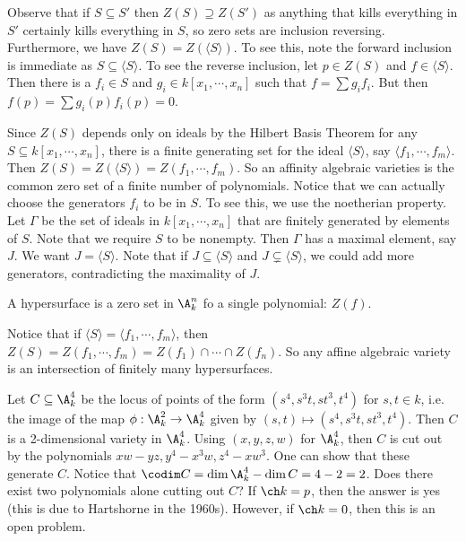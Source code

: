 \begin{rem}
Observe that if $S \subseteq S'$ then $Z(S) \supseteq Z(S')$ as anything that kills everything in $S'$ certainly kills everything in $S$, so zero sets are inclusion reversing. Furthermore, we have $Z(S)=Z(\langle S \rangle)$. To see this, note the forward inclusion is immediate as $S \subseteq \langle S \rangle$. To see the reverse inclusion, let $p \in Z(S)$ and $f \in \langle S \rangle$. Then there is a $f_i \in S$ and $g_i \in k[x_1,\cdots,x_n]$ such that $f=\sum g_i f_i$. But then $f(p)=\sum g_i(p)f_i(p)=0$. 
\end{rem}

\begin{rem}
Since $Z(S)$ depends only on ideals by the Hilbert Basis Theorem for any $S\subseteq k[x_1,\cdots,x_n]$, there is a finite generating set for the ideal $\langle S \rangle$, say $\langle f_1,\cdots,f_m \rangle$. Then $Z(S)=Z(\langle S \rangle)=Z(f_1,\cdots,f_m)$. So an affinity algebraic varieties is the common zero set of a finite number of polynomials. Notice that we can actually choose the generators $f_i$ to be in $S$. To see this, we use the noetherian property. Let $\Gamma$ be the set of ideals in $k[x_1,\cdots,x_n]$ that are finitely generated by elements of $S$. Note that we require $S$ to be nonempty. Then $\Gamma$ has a maximal element, say $J$. We want $J=\langle S \rangle$. Note that if $J \subseteq \langle S \rangle$ and $J \subsetneq \langle S \rangle$, we could add more generators, contradicting the maximality of $J$.
\end{rem}

\begin{dfn}[Hypersurface]
A hypersurface is a zero set in $\A_k^n$ fo a single polynomial: $Z(f)$. 
\end{dfn}

Notice that if $\langle S \rangle = \langle f_1,\cdots,f_m \rangle$, then $Z(S)=Z(f_1,\cdots,f_m)=Z(f_1) \cap \cdots \cap Z(f_n)$. So any affine algebraic variety is an intersection of finitely many hypersurfaces. 

\begin{ex}
Let $C \subseteq \A_k^4$ be the locus of points of the form $(s^4,s^3t,st^3,t^4)$ for $s,t \in k$, i.e. the image of the map $\phi: \A_k^2 \to \A_k^4$ given by $(s,t) \mapsto (s^4,s^3t,st^3,t^4)$. Then $C$ is a 2-dimensional variety in $\A_k^4$. Using $(x,y,z,w)$ for $\A_k^4$, then $C$ is cut out by the polynomials $xw-yz, y^4-x^3w,z^4-xw^3$. One can show that these generate $C$. Notice that $\codim C=\dim \A_k^4-\dim C=4-2=2$. Does there exist two polynomials alone cutting out $C$? If $\ch k=p$, then the answer is yes (this is due to Hartshorne in the 1960s). However, if $\ch k=0$, then this is an open problem. 
\end{ex} 

